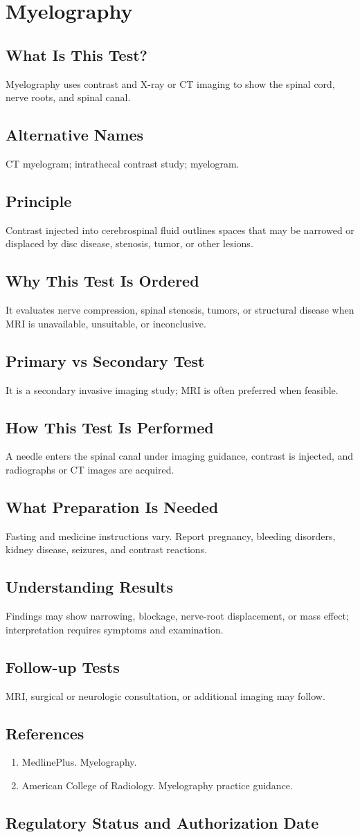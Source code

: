 \chapter{Myelography}
\section*{What Is This Test?} Myelography uses contrast and X-ray or CT imaging to show the spinal cord, nerve roots, and spinal canal.\section*{Alternative Names} CT myelogram; intrathecal contrast study; myelogram.\section*{Principle} Contrast injected into cerebrospinal fluid outlines spaces that may be narrowed or displaced by disc disease, stenosis, tumor, or other lesions.\section*{Why This Test Is Ordered} It evaluates nerve compression, spinal stenosis, tumors, or structural disease when MRI is unavailable, unsuitable, or inconclusive.\section*{Primary vs Secondary Test} It is a secondary invasive imaging study; MRI is often preferred when feasible.\section*{How This Test Is Performed} A needle enters the spinal canal under imaging guidance, contrast is injected, and radiographs or CT images are acquired.\section*{What Preparation Is Needed} Fasting and medicine instructions vary. Report pregnancy, bleeding disorders, kidney disease, seizures, and contrast reactions.\section*{Understanding Results} Findings may show narrowing, blockage, nerve-root displacement, or mass effect; interpretation requires symptoms and examination.\section*{Follow-up Tests} MRI, surgical or neurologic consultation, or additional imaging may follow.\section*{References} \begin{enumerate}\item MedlinePlus. Myelography.\item American College of Radiology. Myelography practice guidance.\end{enumerate}\clearpage\section*{Regulatory Status and Authorization Date}\clearpage
